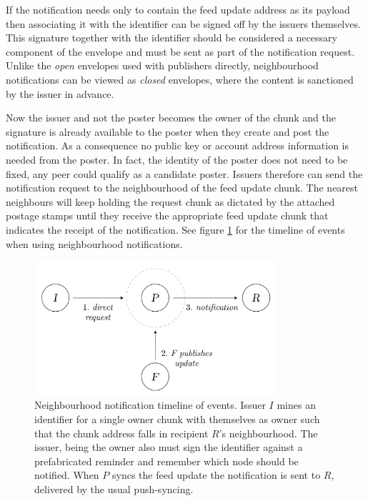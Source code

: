 If the notification needs only to contain the feed update address as its payload then associating it with the identifier can be signed off by the issuers themselves. This signature together with the identifier should be considered a necessary component of the envelope and must be sent as part of the notification request.
Unlike the \emph{open} envelopes used with publishers directly, neighbourhood notifications can be viewed as \emph{closed} envelopes, where the content is sanctioned by the issuer in advance. 

Now the issuer and not the poster becomes the owner of the chunk and the signature is already available to the poster when they create and post the notification. As a consequence no public key or account address information is needed from the poster. In fact, the identity of the poster does not need to be fixed, any peer could qualify as a candidate poster. Issuers therefore can send the notification request to the neighbourhood of the feed update chunk. The nearest neighbours will keep holding the request chunk as dictated by the attached postage stamps until they receive the appropriate feed update chunk that indicates the receipt of the notification. See figure \ref{fig:neighbourhood-notification-events} for the timeline of events when using neighbourhood notifications.

\begin{figure}[htbp]
\centering
\includegraphics[width=0.8\textwidth]{fig/neighbourhood-notification-events.pdf}
\caption[Neighbourhood notification timeline of events \statusgreen]{Neighbourhood notification timeline of events. Issuer $I$ mines an identifier for a single owner chunk with themselves as owner such that the chunk address falls in recipient $R$'s neighbourhood. The issuer, being the owner also must sign the identifier against a prefabricated reminder and remember which node should be notified. When $P$ syncs the feed update the notification is sent to $R$, delivered by the usual push-syncing.}
\label{fig:neighbourhood-notification-events}
\end{figure}
  

